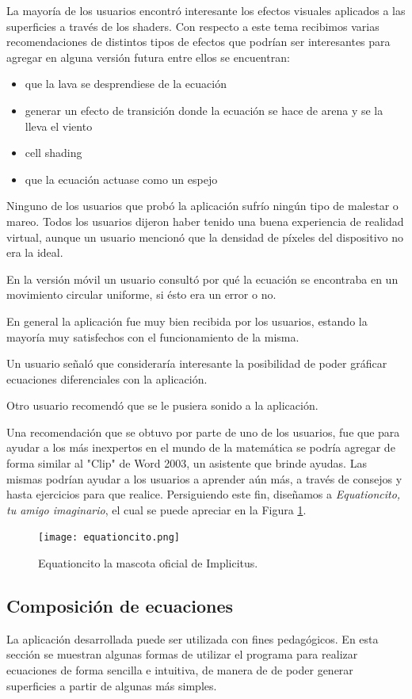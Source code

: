 \documentclass[12pt]{article}
\begin{document}
La mayoría de los usuarios encontró interesante los efectos visuales aplicados a las superficies a través de los shaders. Con respecto a este tema recibimos varias recomendaciones de distintos tipos de efectos que podrían ser interesantes para agregar en alguna versión futura entre ellos se encuentran: 
\begin{itemize}
\item que la lava se desprendiese de la ecuación
\item generar un efecto de transición donde la ecuación se hace de arena y se la lleva el viento
\item cell shading
\item que la ecuación actuase como un espejo
\end{itemize}
Ninguno de los usuarios que probó la aplicación sufrío ningún tipo de malestar o mareo. Todos los usuarios dijeron haber tenido una buena experiencia de realidad virtual, aunque un usuario mencionó que la densidad de píxeles del dispositivo no era la ideal.

En la versión móvil un usuario consultó por qué la ecuación se encontraba en un movimiento circular uniforme, si ésto era un error o no.

En general la aplicación fue muy bien recibida por los usuarios, estando la mayoría muy satisfechos con el funcionamiento de la misma.

Un usuario señaló que consideraría interesante la posibilidad de poder gráficar ecuaciones diferenciales con la aplicación. 

Otro usuario recomendó que se le pusiera sonido a la aplicación.

Una recomendación que se obtuvo por parte de uno de los usuarios, fue que para ayudar a los más inexpertos en el mundo de la matemática se podría agregar de forma similar al "Clip" de Word 2003, un asistente que brinde ayudas. Las mismas podrían ayudar a los usuarios a aprender aún más, a través de consejos y hasta ejercicios para que realice. Persiguiendo este fin, diseñamos a \textit{Equationcito, tu amigo imaginario}, el cual se puede apreciar en la Figura \ref{equationcito}.

\begin{figure}[h]
\texttt{[image: equationcito.png]}
\caption{Equationcito la mascota oficial de Implicitus.}
\label{equationcito}
\end{figure}


\subsection{Composición de ecuaciones}
\noindent La aplicación desarrollada puede ser utilizada con fines pedagógicos. En esta sección se muestran algunas formas de utilizar el programa para  realizar ecuaciones de forma sencilla e intuitiva, de manera de de poder generar superficies a partir de algunas más simples.
\end{document}
